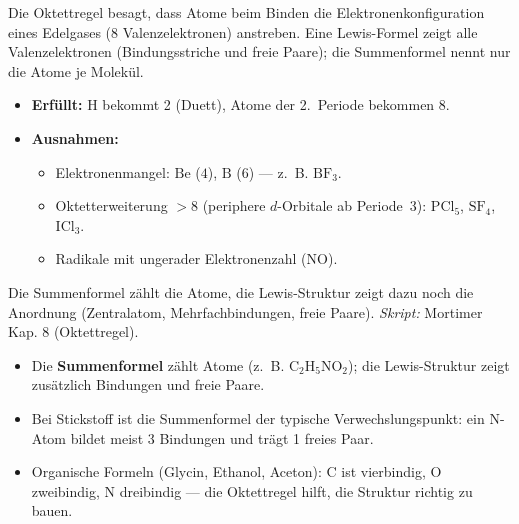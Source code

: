 
Die Oktettregel besagt, dass Atome beim Binden die Elektronenkonfiguration
eines Edelgases (8 Valenzelektronen) anstreben. Eine Lewis-Formel zeigt alle
Valenzelektronen (Bindungsstriche und freie Paare); die Summenformel nennt nur
die Atome je Molekül.

\begin{werkzeugkasten}
\begin{itemize}
  \item \textbf{Erfüllt:} H bekommt 2 (Duett), Atome der 2.\ Periode bekommen 8.
  \item \textbf{Ausnahmen:}
    \begin{itemize}
      \item Elektronenmangel: $\mathrm{Be}$ ($4$), $\mathrm{B}$ ($6$) --- z.\ B.
        $\mathrm{BF_3}$.
      \item Oktetterweiterung $>8$ (periphere $d$-Orbitale ab Periode~3):
        $\mathrm{PCl_5}$, $\mathrm{SF_4}$, $\mathrm{ICl_3}$.
      \item Radikale mit ungerader Elektronenzahl ($\mathrm{NO}$).
    \end{itemize}
\end{itemize}
Die Summenformel zählt die Atome, die Lewis-Struktur zeigt dazu noch die
Anordnung (Zentralatom, Mehrfachbindungen, freie Paare).
\textit{Skript:} Mortimer Kap. 8 (Oktettregel).
\end{werkzeugkasten}

\begin{achtung}
\begin{itemize}
  \item Die \textbf{Summenformel} zählt Atome (z.\ B. $\mathrm{C_2H_5NO_2}$); die
        Lewis-Struktur zeigt zusätzlich Bindungen und freie Paare.
  \item Bei Stickstoff ist die Summenformel der typische Verwechslungspunkt:
        ein N-Atom bildet meist 3 Bindungen und trägt 1 freies Paar.
  \item Organische Formeln (Glycin, Ethanol, Aceton): $\mathrm{C}$ ist
        vierbindig, $\mathrm{O}$ zweibindig, $\mathrm{N}$ dreibindig --- die
        Oktettregel hilft, die Struktur richtig zu bauen.
\end{itemize}
\end{achtung}
